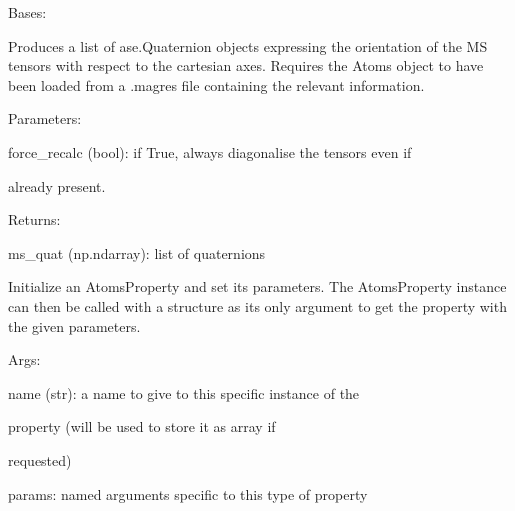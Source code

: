 \documentclass[letterpaper,10pt,english]{sphinxmanual}
\begin{document}
\begin{fulllineitems}
\label{doctree/soprano.properties.nmr.ms:soprano.properties.nmr.ms.MSQuaternion}
Bases: {\hyperref[doctree/soprano.properties.atomsproperty:soprano.properties.atomsproperty.AtomsProperty]{\emph{}}}

Produces a list of ase.Quaternion objects expressing the orientation of
the MS tensors with respect to the cartesian axes.
Requires the Atoms object to have been loaded from a .magres file
containing the relevant information.

\begin{DUlineblock}{0em}
\item[] Parameters:
\item[]
\begin{DUlineblock}{\DUlineblockindent}
\item[] force\_recalc (bool): if True, always diagonalise the tensors even if
\item[]
\begin{DUlineblock}{\DUlineblockindent}
\item[] already present.
\end{DUlineblock}
\end{DUlineblock}
\end{DUlineblock}

\begin{DUlineblock}{0em}
\item[] Returns:
\item[]
\begin{DUlineblock}{\DUlineblockindent}
\item[] ms\_quat (np.ndarray): list of quaternions
\end{DUlineblock}
\end{DUlineblock}

Initialize an AtomsProperty and set its parameters.
The AtomsProperty instance can then be called with a structure as its
only argument to get the property with the given parameters.

\begin{DUlineblock}{0em}
\item[] Args:
\item[]
\begin{DUlineblock}{\DUlineblockindent}
\item[] name (str): a name to give to this specific instance of the
\item[]
\begin{DUlineblock}{\DUlineblockindent}
\item[] property (will be used to store it as array if
\item[] requested)
\end{DUlineblock}
\item[] params: named arguments specific to this type of property
\end{DUlineblock}
\end{DUlineblock}


\end{fulllineitems}
\end{document}
